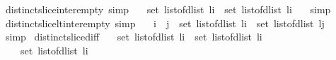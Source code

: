 \begin{isabellebody}
\endisatagproof
{\isafoldproof}%
%
\isadelimproof
\isanewline
%
\endisadelimproof
\isanewline
{}\isamarkupfalse%
\ distinct{\isacharunderscore}slice{\isacharunderscore}inter{\isacharunderscore}empty\ {\isacharbrackleft}simp{\isacharbrackright}{\isacharcolon}\ \isanewline
\ \ {\isachardoublequoteopen}set\ {\isacharparenleft}list{\isacharunderscore}of{\isacharunderscore}dlist\ {\isacharparenleft}l{\isasymdagger}{\isachardot}{\isachardot}i{\isacharparenright}{\isacharparenright}\ {\isasyminter}\ set\ {\isacharparenleft}list{\isacharunderscore}of{\isacharunderscore}dlist\ {\isacharparenleft}l{\isasymdagger}i{\isachardot}{\isachardot}{\isacharparenright}{\isacharparenright}\ {\isacharequal}\ {\isacharbraceleft}{\isacharbraceright}{\isachardoublequoteclose}\isanewline
%
\isadelimproof
%
\endisadelimproof
%
\isatagproof
{}\isamarkupfalse%
\ simp%
\endisatagproof
{\isafoldproof}%
%
\isadelimproof
\isanewline
%
\endisadelimproof
\isanewline
{}\isamarkupfalse%
\ distinct{\isacharunderscore}slice{\isacharunderscore}lt{\isacharunderscore}inter{\isacharunderscore}empty\ {\isacharbrackleft}simp{\isacharbrackright}{\isacharcolon}\ \isanewline
\ \ {\isachardoublequoteopen}i\ {\isacharless}\ j\ {\isasymLongrightarrow}\ set\ {\isacharparenleft}list{\isacharunderscore}of{\isacharunderscore}dlist\ {\isacharparenleft}l{\isasymdagger}{\isachardot}{\isachardot}i{\isacharparenright}{\isacharparenright}\ {\isasyminter}\ set\ {\isacharparenleft}list{\isacharunderscore}of{\isacharunderscore}dlist\ {\isacharparenleft}l{\isasymdagger}j{\isachardot}{\isachardot}{\isacharparenright}{\isacharparenright}\ {\isacharequal}\ {\isacharbraceleft}{\isacharbraceright}{\isachardoublequoteclose}\isanewline
%
\isadelimproof
%
\endisadelimproof
%
\isatagproof
{}\isamarkupfalse%
\ simp%
\endisatagproof
{\isafoldproof}%
%
\isadelimproof
\isanewline
%
\endisadelimproof
\isanewline
{}\isamarkupfalse%
\ distinct{\isacharunderscore}slice{\isacharunderscore}diff{}{\isacharcolon}\ \isanewline
\ \ {\isachardoublequoteopen}set\ {\isacharparenleft}list{\isacharunderscore}of{\isacharunderscore}dlist\ {\isacharparenleft}l{\isasymdagger}{\isachardot}{\isachardot}i{\isacharparenright}{\isacharparenright}\ {\isacharminus}\ set\ {\isacharparenleft}list{\isacharunderscore}of{\isacharunderscore}dlist\ {\isacharparenleft}l{\isasymdagger}i{\isachardot}{\isachardot}{\isacharparenright}{\isacharparenright}\ {\isacharequal}\ \isanewline
\ \ \ \ set\ {\isacharparenleft}list{\isacharunderscore}of{\isacharunderscore}dlist\ {\isacharparenleft}l{\isasymdagger}{\isachardot}{\isachardot}i{\isacharparenright}{\isacharparenright}{\isachardoublequoteclose}\isanewline

\end{isabellebody}
